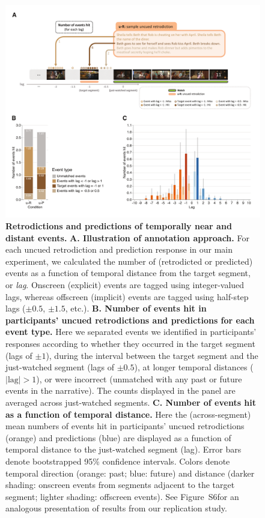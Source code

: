 \documentclass[10pt]{article}
\newcommand{\hitRates}{S6}
\begin{document}
\begin{figure}[tp]
  \centering
  \includegraphics[width=\textwidth]{results2}
  \caption{\textbf{Retrodictions and predictions of temporally near and distant events.}  \textbf{A. Illustration of annotation approach.}  For each uncued retrodiction and prediction response in our main experiment, we calculated the number of (retrodicted or predicted) events as a function of temporal distance from the target segment, or \textit{lag}.  Onscreen (explicit) events are tagged using integer-valued lags, whereas offscreen (implicit) events are tagged using half-step lags ($\pm 0.5$, $\pm 1.5$, etc.).  \textbf{B. Number of events hit in participants' uncued retrodictions and predictions for each event type.}  Here we separated events we identified in participants' responses according to whether they occurred in the target segment (lags of $\pm 1$), during the interval between the target segment and the just-watched segment (lags of $\pm 0.5$), at longer temporal distances ($|\mathrm{lag}| > 1$), or were incorrect (unmatched with any past or future events in the narrative).  The counts displayed in the panel are averaged across just-watched segments.  \textbf{C. Number of events hit as a function of temporal distance.}  Here the (across-segment) mean numbers of events hit in participants' uncued retrodictions (orange) and predictions (blue) are displayed as a function of temporal distance to the just-watched segment (lag).  Error bars denote bootstrapped 95\% confidence intervals.  Colors denote temporal direction (orange: past; blue: future) and distance (darker shading: onscreen events from segments adjacent to the target segment; lighter shading: offscreen events).  See Figure~\hitRates for an analogous presentation of results from our replication study.}
  \label{fig:result2}
\end{figure}
\end{document}

